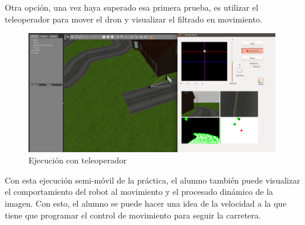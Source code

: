 Otra opción, una vez haya superado esa primera prueba, es utilizar el teleoperador para mover el dron y visualizar el filtrado en movimiento.

\begin{figure}[H]
  \begin{center}
    \includegraphics[width=0.98\textwidth]{figures/ejec_semiestat_fr.png}
		\caption{Ejecución con teleoperador}
		\label{fig.esefr}
		\end{center}
\end{figure}

Con esta ejecución semi-móvil de la práctica, el alumno también puede visualizar el comportamiento del robot al movimiento y el procesado dinámico de la imagen. Con esto, el alumno se puede hacer una idea de la velocidad a la que tiene que programar el control de movimiento para seguir la carretera.